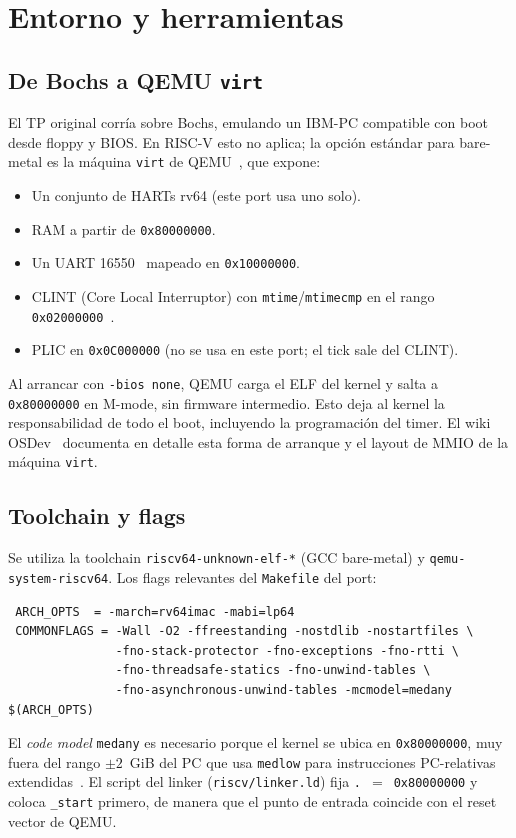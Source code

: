 \section{Entorno y herramientas}

\subsection{De Bochs a QEMU \texttt{virt}}

El TP original corría sobre Bochs, emulando un IBM-PC compatible con boot desde floppy y BIOS. En RISC-V esto no
aplica; la opción estándar para bare-metal es la máquina \texttt{virt} de QEMU~\cite{qemu-virt}, que expone:

\begin{itemize}
  \item Un conjunto de HARTs rv64 (este port usa uno solo).
  \item RAM a partir de \texttt{0x80000000}.
  \item Un UART 16550~\cite{ns16550} mapeado en \texttt{0x10000000}.
  \item CLINT (Core Local Interruptor) con \texttt{mtime}/\texttt{mtimecmp} en el rango
  \texttt{0x02000000}~\cite{riscv-aclint}.
  \item PLIC en \texttt{0x0C000000} (no se usa en este port; el tick sale del CLINT).
\end{itemize}

Al arrancar con \texttt{-bios none}, QEMU carga el ELF del kernel y salta a \texttt{0x80000000} en M-mode, sin
firmware intermedio. Esto deja al kernel la responsabilidad de todo el boot, incluyendo la programación del timer.
El wiki OSDev~\cite{osdev-riscv} documenta en detalle esta forma de arranque y el layout de MMIO de la máquina
\texttt{virt}.

\subsection{Toolchain y flags}

Se utiliza la toolchain \texttt{riscv64-unknown-elf-*} (GCC bare-metal) y \texttt{qemu-system-riscv64}. Los flags
relevantes del \texttt{Makefile} del port:

\begin{codesnippet}
\begin{verbatim}
 ARCH_OPTS  = -march=rv64imac -mabi=lp64
 COMMONFLAGS = -Wall -O2 -ffreestanding -nostdlib -nostartfiles \
               -fno-stack-protector -fno-exceptions -fno-rtti \
               -fno-threadsafe-statics -fno-unwind-tables \
               -fno-asynchronous-unwind-tables -mcmodel=medany $(ARCH_OPTS)
\end{verbatim}
\end{codesnippet}

El \emph{code model} \texttt{medany} es necesario porque el kernel se ubica en \texttt{0x80000000}, muy fuera del
rango $\pm 2$~GiB del PC que usa \texttt{medlow} para instrucciones PC-relativas extendidas~\cite{riscv-psabi}. El
script del linker (\texttt{riscv/linker.ld}) fija \texttt{.}~$=$~\texttt{0x80000000} y coloca \texttt{\_start} primero,
de manera que el punto de entrada coincide con el reset vector de QEMU.
